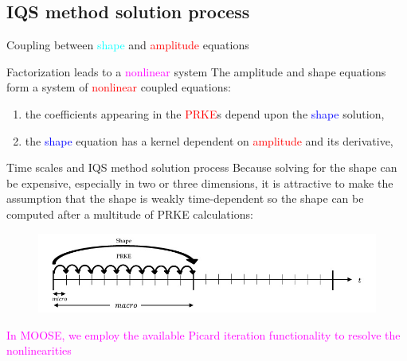 \documentclass[8pt]{beamer}
\newcommand{\ben}{\begin{enumerate}}
\newcommand{\een}{\end{enumerate}}
\newcommand{\tcr}[1]{\textcolor{red}{#1}}
\newcommand{\tcb}[1]{\textcolor{blue}{#1}}
\newcommand{\tcm}[1]{\textcolor{magenta}{#1}}
\begin{document}
\subsection{IQS method solution process}

\begin{frame}{Coupling between \textcolor{cyan}{shape} and \tcr{amplitude} equations}

\begin{block}{Factorization leads to a \tcm{nonlinear} system}
The amplitude and shape equations form a system of \tcr{nonlinear} coupled equations: 
\ben
\item the coefficients appearing in the \tcr{PRKE}s depend upon the \tcb{shape} solution,
\item the \tcb{shape} equation has a kernel dependent on \tcr{amplitude} and its derivative,  
\een
\end{block}

\begin{block}{Time scales and IQS method solution process}
Because solving for the shape can be expensive, especially in two or three dimensions, it is attractive to make the assumption that the shape is weakly time-dependent so the shape can be computed after a multitude of PRKE calculations:
%

\begin{figure}[h]
\includegraphics[width=\linewidth]{figures/IQS_visualization.jpg}
\label{fig:IQS}
\end{figure}

\tcm{In MOOSE, we employ the available Picard iteration functionality to resolve the nonlinearities}
\end{block}
\end{frame}
\end{document}

